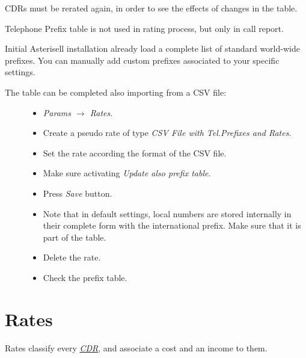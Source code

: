 \documentclass[letterpaper,10pt,english]{sphinxmanual}
\begin{document}
CDRs must be rerated again, in order to see the effects of changes in the table.

Telephone Prefix table is not used in rating process, but only in call report.

Initial Asterisell installation already load a complete list of standard world-wide prefixes. You can manually add custom prefixes associated to your specific settings.
\begin{description}
\item[{The table can be completed also importing from a CSV file:}] \leavevmode\begin{itemize}
\item {} 
\emph{Params \(\rightarrow\) Rates}.

\item {} 
Create a pseudo rate of type \emph{CSV File with Tel.Prefixes and Rates}.

\item {} 
Set the rate according the format of the CSV file.

\item {} 
Make sure activating \emph{Update also prefix table}.

\item {} 
Press \emph{Save} button.

\item {} 
Note that in default settings, local numbers are stored internally in their complete form with the international prefix. Make sure that it is part of the table.

\item {} 
Delete the rate.

\item {} 
Check the prefix table.

\end{itemize}

\end{description}


\section{Rates}
\label{index:cdr-rating-process}\label{index:rates}
Rates classify every {\hyperref[index:term-cdr]{\emph{CDR}}}, and associate a cost and an income to them.
\end{document}
